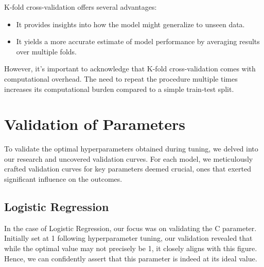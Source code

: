 \documentclass[conference]{IEEEtran}
\begin{document}
K-fold cross-validation offers several advantages:
\begin{itemize}
    \item It provides insights into how the model might generalize to unseen data.
    \item It yields a more accurate estimate of model performance by averaging results over multiple folds.
\end{itemize}

However, it's important to acknowledge that K-fold cross-validation comes with computational overhead. The need to repeat the procedure multiple times increases its computational burden compared to a simple train-test split.

\begin{table}[htbp]
\centering
{}
\caption{K-Fold Results}
\label{tab:svm-comparison}
\end{table}

\section{Validation of Parameters}

To validate the optimal hyperparameters obtained during tuning, we delved into our research and uncovered validation curves. For each model, we meticulously crafted validation curves for key parameters deemed crucial, ones that exerted significant influence on the outcomes.

\subsection{Logistic Regression}

In the case of Logistic Regression, our focus was on validating the C parameter. Initially set at 1 following hyperparameter tuning, our validation revealed that while the optimal value may not precisely be 1, it closely aligns with this figure. Hence, we can confidently assert that this parameter is indeed at its ideal value.
\end{document}
